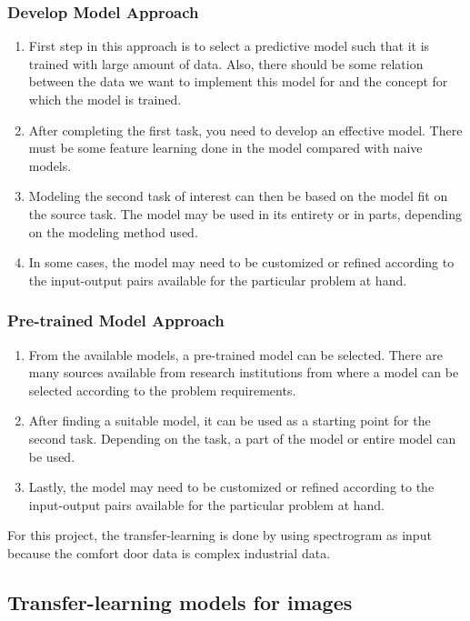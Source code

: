     \subsubsection{Develop Model Approach}
    \begin{enumerate}
    	\item First step in this approach is to select a predictive model such that it is trained with large amount of data. Also, there should be some relation between the data we want to implement this model for and the concept for which the model is trained.
    	\item After completing the first task, you need to develop an effective model. There must be some feature learning done in the model compared with naive models.
    	\item Modeling the second task of interest can then be based on the model fit on the source task. The model may be used in its entirety or in parts, depending on the modeling method used.
    	\item  In some cases, the model may need to be customized or refined according to the input-output pairs available for the particular problem at hand.
    \end{enumerate}
    \subsubsection{Pre-trained Model Approach}
     \begin{enumerate}
     	\item From the available models, a pre-trained model can be selected. There are many sources available from research institutions from where a model can be selected according to the problem requirements.
     	\item After finding a suitable model, it can be used as a starting point for the second task. Depending on the task, a part of the model or entire model can be used.
     
     	\item  Lastly, the model may need to be customized or refined according to the input-output pairs available for the particular problem at hand.
     \end{enumerate}
    
    For this project, the transfer-learning is done by using spectrogram as input because the comfort door data is complex industrial data.
    
    \subsection{Transfer-learning models for images}
   
